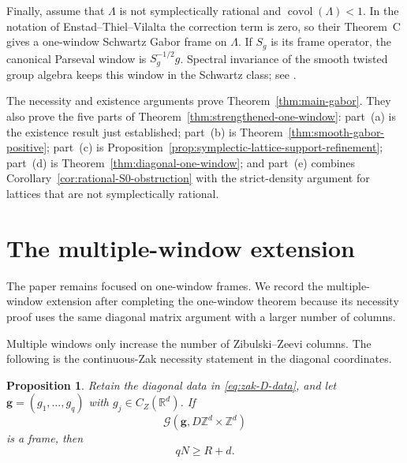 \documentclass[11pt,reqno]{amsart}
\numberwithin{equation}{section}
\newtheorem{proposition}[theorem]{Proposition}
\theoremstyle{definition}
\theoremstyle{remark}
\newcommand{\R}{\mathbb R}
\newcommand{\Z}{\mathbb Z}
\newcommand{\covol}{\operatorname{covol}}
\newcommand{\G}{\mathcal G}
\newcommand{\CZ}{C_Z}
\begin{document}
Finally, assume that $\Lambda$ is not symplectically rational and
$\covol(\Lambda)<1$.  In the notation of Enstad--Thiel--Vilalta the
correction term is zero, so their Theorem~C
\cite{EnstadThielVilalta2025} gives a one-window Schwartz Gabor frame on
$\Lambda$.  If $S_g$ is its frame operator, the canonical Parseval window is
$S_g^{-1/2}g$.  Spectral invariance of the smooth twisted group algebra keeps
this window in the Schwartz class; see
\cite{Luef2009Projections,JakobsenLuef2020}.

The necessity and existence arguments prove
Theorem~\ref{thm:main-gabor}.  They also prove the five parts of
Theorem~\ref{thm:strengthened-one-window}: part~(a) is the existence result
just established; part~(b) is
Theorem~\ref{thm:smooth-gabor-positive}; part~(c) is
Proposition~\ref{prop:symplectic-lattice-support-refinement}; part~(d) is
Theorem~\ref{thm:diagonal-one-window}; and part~(e) combines
Corollary~\ref{cor:rational-S0-obstruction} with the strict-density argument
for lattices that are not symplectically rational.

\section{The multiple-window extension}
\label{subsec:multiwindow-adjustment}

The paper remains focused on one-window frames.  We record the multiple-window
extension after completing the one-window theorem because its necessity proof
uses the same diagonal matrix argument with a larger number of columns.

Multiple windows only increase the number of Zibulski--Zeevi columns.  The following is the continuous-Zak necessity statement in the diagonal coordinates.

\begin{proposition}
\label{prop:continuous-zak-multiwindow}
Retain the diagonal data in \eqref{eq:zak-D-data}, and let
$\mathbf g=(g_1,\ldots,g_q)$ with $g_j\in\CZ(\R^d)$.  If
\[
       \G(\mathbf g,D\Z^d\times\Z^d)
\]
is a frame, then
\begin{equation}\label{eq:multiwindow-diagonal-gap}
                              qN\ge R+d.
\end{equation}
\end{proposition}
\end{document}
